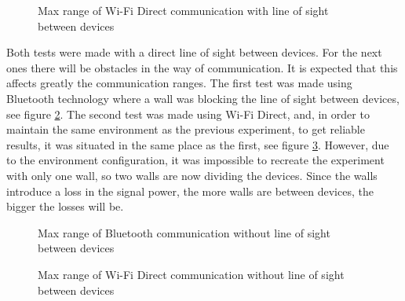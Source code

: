 \begin{figure}[ht]
   \noindent{}
	\caption{\label{fig:wfdMaxVisib} Max range of Wi-Fi Direct communication with line of sight between devices}
\end{figure}

Both tests were made with a direct line of sight between devices. For the next ones there will be obstacles in the way of communication. It is expected that this affects greatly the communication ranges. The first test was made using Bluetooth technology where a wall was blocking the line of sight between devices, see figure \ref{fig:btMaxInv}. The second test was made using Wi-Fi Direct, and, in order to maintain the same environment as the previous experiment, to get reliable results, it was situated in the same place as the first, see figure \ref{fig:wfdMaxInv}. However, due to the environment configuration, it was impossible to recreate the experiment with only one wall, so two walls are now dividing the devices. Since the walls introduce a loss in the signal power, the more walls are between devices, the bigger the losses will be.

\begin{figure}[ht]
   \noindent{}
	\caption{\label{fig:btMaxInv} Max range of Bluetooth communication without line of sight between devices}
\end{figure}

\begin{figure}[ht]
   \noindent{}
	\caption{\label{fig:wfdMaxInv} Max range of Wi-Fi Direct communication without line of sight between devices}
\end{figure}


